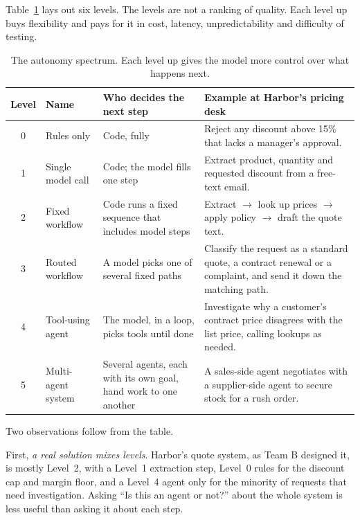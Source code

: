 Table~\ref{tab:autonomy} lays out six levels. The levels are not a ranking of quality. Each level up buys flexibility and pays for it in cost, latency, unpredictability and difficulty of testing.

\begin{table}[htbp]
\centering
\small
\caption{The autonomy spectrum. Each level up gives the model more control over what happens next.}
\label{tab:autonomy}
\begin{tabularx}{\textwidth}{@{}c>{\raggedright\arraybackslash}p{2.6cm}>{\raggedright\arraybackslash}X>{\raggedright\arraybackslash}X@{}}
\toprule
Level & Name & Who decides the next step & Example at Harbor's pricing desk \\
\midrule
0 & Rules only & Code, fully & Reject any discount above 15\% that lacks a manager's approval. \\
1 & Single model call & Code; the model fills one step & Extract product, quantity and requested discount from a free-text email. \\
2 & Fixed workflow & Code runs a fixed sequence that includes model steps & Extract $\rightarrow$ look up prices $\rightarrow$ apply policy $\rightarrow$ draft the quote text. \\
3 & Routed workflow & A model picks one of several fixed paths & Classify the request as a standard quote, a contract renewal or a complaint, and send it down the matching path. \\
4 & Tool-using agent & The model, in a loop, picks tools until done & Investigate why a customer's contract price disagrees with the list price, calling lookups as needed. \\
5 & Multi-agent system & Several agents, each with its own goal, hand work to one another & A sales-side agent negotiates with a supplier-side agent to secure stock for a rush order. \\
\bottomrule
\end{tabularx}
\end{table}

Two observations follow from the table.

First, \emph{a real solution mixes levels}. Harbor's quote system, as Team B designed it, is mostly Level~2, with a Level~1 extraction step, Level~0 rules for the discount cap and margin floor, and a Level~4 agent only for the minority of requests that need investigation. Asking ``Is this an agent or not?'' about the whole system is less useful than asking it about each step.

